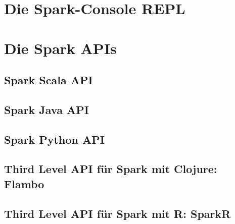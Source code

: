 \section{Die Spark-Console REPL}
\label{section:repl}


\section{Die Spark APIs}
\label{section:APIs}


\subsection{Spark Scala API}
\label{section:scala}

\subsection{Spark Java API}
\label{section:java}

\subsection{Spark Python API}
\label{section:python}

\subsection{Third Level API für Spark mit Clojure: Flambo}
\label{section:flambo}

\subsection{Third Level API für Spark mit R: SparkR}
\label{section:sparkr}

























